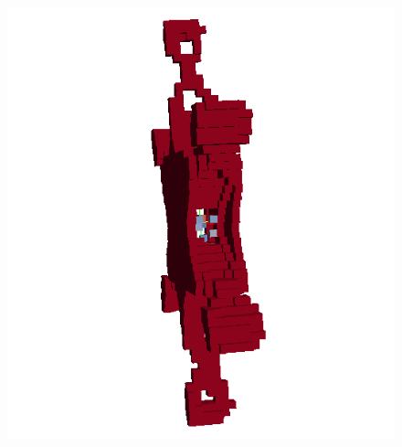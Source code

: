 \begin{frame}
\begin{minipage}{0.85\textwidth}
{\begin{figure}
			\includegraphics[scale=0.06]{Pictures/TopOp/Star_Optimized5_Trans.png}
			\end{figure}
			\vspace{5em}
			}
		\end{minipage}
		\begin{minipage}{0.14\textwidth}
			\begin{figure}
				\\

\end{figure}
\end{minipage}
\end{frame}
